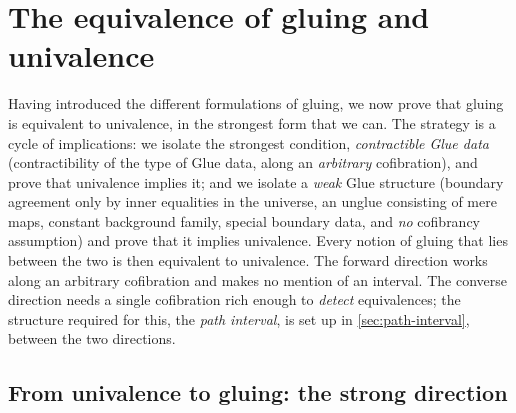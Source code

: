 \section{The equivalence of gluing and univalence}\label{sec:glue-ua}

Having introduced the different formulations of gluing, we now prove that
gluing is equivalent to univalence, in the strongest form that we can. The
strategy is a cycle of implications: we isolate the strongest condition,
\emph{contractible Glue data} (contractibility of the type of Glue data,
along an \emph{arbitrary} cofibration), and prove that univalence implies
it; and
we isolate a \emph{weak} Glue structure (boundary agreement only by
inner equalities in the universe, an unglue consisting of mere maps, constant
background family, special boundary data, and \emph{no} cofibrancy
assumption) and prove that it implies univalence. Every notion of
gluing that lies between the two is then equivalent to univalence. The
forward direction works along an arbitrary cofibration and makes no
mention of an interval. The converse direction needs a
single cofibration rich enough to \emph{detect} equivalences; the
structure required for this, the \emph{path interval}, is set up in
\cref{sec:path-interval}, between the two directions.

\subsection{From univalence to gluing: the strong direction}

